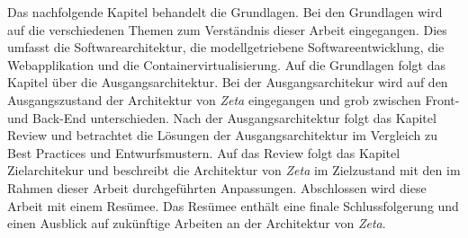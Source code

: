 Das nachfolgende Kapitel behandelt die Grundlagen. Bei den Grundlagen wird auf die verschiedenen Themen zum Verständnis dieser Arbeit eingegangen. Dies umfasst die Softwarearchitektur, die modellgetriebene Softwareentwicklung, die Webapplikation und die Containervirtualisierung. Auf die Grundlagen folgt das Kapitel über die Ausgangsarchitektur. Bei der Ausgangsarchitekur wird auf den Ausgangszustand der Architektur von \textit{Zeta} eingegangen und grob zwischen Front- und Back-End unterschieden. Nach der Ausgangsarchitektur folgt das Kapitel Review und betrachtet die Lösungen der Ausgangsarchitektur im Vergleich zu Best Practices und Entwurfsmustern. Auf das Review folgt das Kapitel Zielarchitekur und beschreibt die Architektur von \textit{Zeta} im Zielzustand mit den im Rahmen dieser Arbeit durchgeführten Anpassungen. Abschlossen wird diese Arbeit mit einem Resümee. Das Resümee enthält eine finale Schlussfolgerung und einen Ausblick auf zukünftige Arbeiten an der Architektur von \textit{Zeta}.

